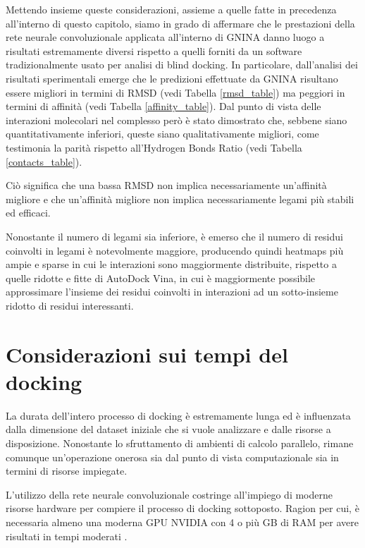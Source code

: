 Mettendo insieme queste considerazioni, assieme a quelle fatte in precedenza all'interno di questo capitolo, siamo in grado di affermare che le prestazioni della rete neurale convoluzionale applicata all'interno di GNINA danno luogo a risultati estremamente diversi rispetto a quelli forniti da un software tradizionalmente usato per analisi di blind docking. 
In particolare, dall'analisi dei risultati sperimentali emerge che le predizioni effettuate da GNINA risultano essere migliori in termini di RMSD (vedi Tabella \ref{rmsd_table}) ma peggiori in termini di affinità (vedi Tabella \ref{affinity_table}). Dal punto di vista delle interazioni molecolari nel complesso però è stato dimostrato che, sebbene siano quantitativamente inferiori, queste siano qualitativamente migliori, come testimonia la parità rispetto all'Hydrogen Bonds Ratio (vedi Tabella \ref{contacts_table}).

Ciò significa che una bassa RMSD non implica necessariamente un'affinità migliore e che un'affinità migliore non implica necessariamente legami più stabili ed efficaci. 

Nonostante il numero di legami sia inferiore, è emerso che il numero di residui coinvolti in legami è notevolmente maggiore, producendo quindi heatmaps più ampie e sparse in cui le interazioni sono maggiormente distribuite, rispetto a quelle ridotte e fitte di AutoDock Vina, in cui è maggiormente possibile approssimare l'insieme dei residui coinvolti in interazioni ad un sotto-insieme ridotto di residui interessanti.



\section{Considerazioni sui tempi del docking}
La durata dell'intero processo di docking è estremamente lunga ed è influenzata dalla dimensione del dataset iniziale che si vuole analizzare e dalle risorse a disposizione. Nonostante lo sfruttamento di ambienti di calcolo parallelo, rimane comunque un'operazione onerosa sia dal punto di vista computazionale sia in termini di risorse impiegate. 

L'utilizzo della rete neurale convoluzionale costringe all'impiego di moderne risorse hardware per compiere il processo di docking sottoposto. 
Ragion per cui, è necessaria almeno una moderna GPU NVIDIA con 4 o più GB di RAM per avere risultati in tempi moderati \cite{mcnutt_gnina_2021}. 

